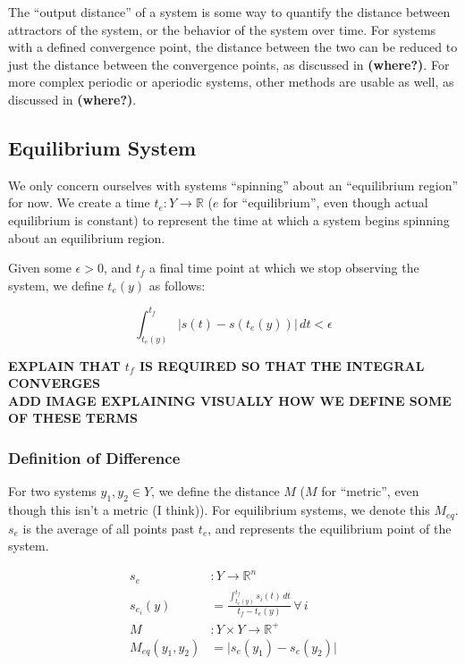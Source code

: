 \documentclass{article}
\begin{document}
The ``output distance'' of a system is some way to quantify the distance between attractors of the system, or the behavior of the system over time. For systems with a defined convergence point, the distance between the two can be reduced to just the distance between the convergence points, as discussed in \textbf{(where?)}. For more complex periodic or aperiodic systems, other methods are usable as well, as discussed in \textbf{(where?)}.

\subsection{Equilibrium System}
We only concern ourselves with systems ``spinning'' about an ``equilibrium region'' for now. We create a time $t_e : Y \to \mathbb{R}$ ($e$ for ``equilibrium'', even though actual equilibrium is constant) to represent the time at which a system begins spinning about an equilibrium region.

Given some $\epsilon > 0$, and $t_f$ a final time point at which we stop observing the system, we define $t_e(y)$ as follows:

\begin{equation}
  \int_{t_e(y)}^{t_f} \lvert s(t) - s(t_e(y)) \rvert\, dt < \epsilon \label{t_e}
\end{equation}

\textbf{EXPLAIN THAT $t_f$ IS REQUIRED SO THAT THE INTEGRAL CONVERGES \\
ADD IMAGE EXPLAINING VISUALLY HOW WE DEFINE SOME OF THESE TERMS}

\subsubsection{Definition of Difference}
For two systems $y_1, y_2 \in Y$, we define the distance $M$ ($M$ for ``metric'', even though this isn't a metric (I think)). For equilibrium systems, we denote this $M_{eq}$. $s_e$ is the average of all points past $t_e$, and represents the equilibrium point of the system.

\begin{align}
  s_e &: Y \to \mathbb{R}^n \\
  s_{e_i}(y) &= \frac{\int_{t_e(y)}^{t_f} s_i(t) \,dt}{t_f - t_e(y)} \,\forall\, i \\
  M &: Y \times Y \to \mathbb{R}^+ \\
  M_{eq}(y_1, y_2) &= \lvert s_e(y_1) - s_e(y_2) \rvert \label{distance}
\end{align}
\end{document}
